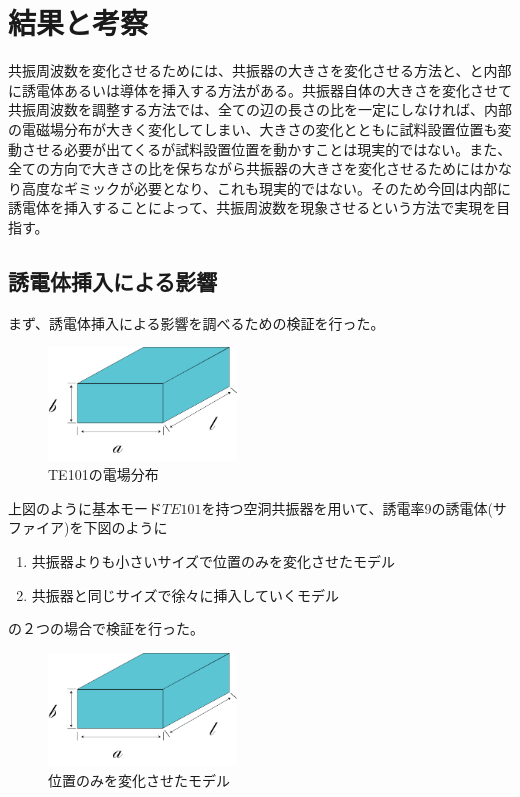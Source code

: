 \chapter{結果と考察}
共振周波数を変化させるためには、共振器の大きさを変化させる方法と、と内部に誘電体あるいは導体を挿入する方法がある。共振器自体の大きさを変化させて共振周波数を調整する方法では、全ての辺の長さの比を一定にしなければ、内部の電磁場分布が大きく変化してしまい、大きさの変化とともに試料設置位置も変動させる必要が出てくるが試料設置位置を動かすことは現実的ではない。また、全ての方向で大きさの比を保ちながら共振器の大きさを変化させるためにはかなり高度なギミックが必要となり、これも現実的ではない。そのため今回は内部に誘電体を挿入することによって、共振周波数を現象させるという方法で実現を目指す。


\section{誘電体挿入による影響}
まず、誘電体挿入による影響を調べるための検証を行った。

\vspace{10 mm}

\begin{figure}[h]
  \begin{center}
    \includegraphics[width=5cm]{./image/空洞共振器.png}
    \caption{TE101の電場分布}
    \label{fig:E-TE101}
  \end{center}
\end{figure}

上図のように基本モード$TE101$を持つ空洞共振器を用いて、誘電率9の誘電体(サファイア)を下図のように

\begin{enumerate}
  \item 共振器よりも小さいサイズで位置のみを変化させたモデル
  \item 共振器と同じサイズで徐々に挿入していくモデル
\end{enumerate}

の２つの場合で検証を行った。

\vspace{10 mm}

\begin{figure}[h]
  \begin{center}
    \includegraphics[width=5cm]{./image/空洞共振器.png}
    \caption{位置のみを変化させたモデル}
    \label{fig:potition}
  \end{center}
\end{figure}

